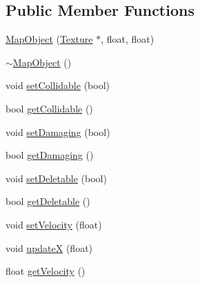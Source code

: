 \subsection*{Public Member Functions}
\begin{DoxyCompactItemize}
\item 
\hyperlink{class_map_object_a1bd76f155f6f90b7d74a06f720bd3b3d}{Map\+Object} (\hyperlink{class_texture}{Texture} $\ast$, float, float)
\item 
\hyperlink{class_map_object_aa601344267a49df197e841fcbd732209}{$\sim$\+Map\+Object} ()
\item 
void \hyperlink{class_map_object_afc35a1271fdb83198e239a548b26337e}{set\+Collidable} (bool)
\item 
bool \hyperlink{class_map_object_a5c940048e408308c71b57a78444d155d}{get\+Collidable} ()
\item 
void \hyperlink{class_map_object_abcf8499f40944338e194abcbd3294852}{set\+Damaging} (bool)
\item 
bool \hyperlink{class_map_object_acaa0fff07bd2550c1f023ca90e2a4b04}{get\+Damaging} ()
\item 
void \hyperlink{class_map_object_af14721fd27162d9fd0f04f69d8087811}{set\+Deletable} (bool)
\item 
bool \hyperlink{class_map_object_a739bba3a3a50a84bf5e6244d19152a38}{get\+Deletable} ()
\item 
void \hyperlink{class_map_object_a45334339657baae05374453254441351}{set\+Velocity} (float)
\item 
void \hyperlink{class_map_object_aea8289c05e1c4cd99fabc8cb756535e4}{update\+X} (float)
\item 
float \hyperlink{class_map_object_a5a9530b3b098db1e9fe636d0ab92c4ff}{get\+Velocity} ()
\end{DoxyCompactItemize}
